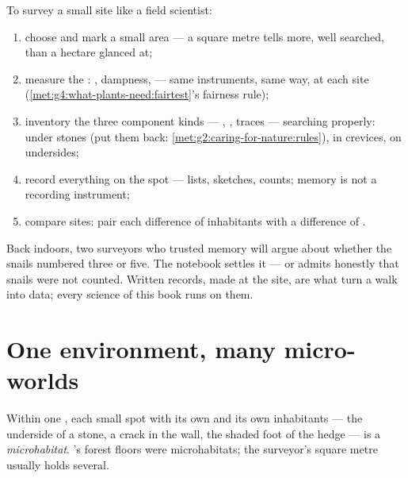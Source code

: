 \begin{method}\label{met:g6:exploring-our-environment:survey}
To survey a small site like a field scientist:
\begin{enumerate}
  \item choose and mark a small area --- a square metre tells
        more, well searched, than a hectare glanced at;
  \item measure the : , dampness, 
        --- same instruments, same way, at each site
        (\cref{met:g4:what-plants-need:fairtest}'s fairness
        rule);
  \item inventory the three component kinds --- ,
        , traces --- searching properly: under
        stones (put them back:
        \cref{met:g2:caring-for-nature:rules}), in crevices,
        on  undersides;
  \item record everything on the spot --- lists, sketches,
        counts; memory is not a recording instrument;
  \item compare sites: pair each difference of inhabitants
        with a difference of .
\end{enumerate}
\end{method}

\begin{remark}\label{rem:g6:exploring-our-environment:records}
Back indoors, two surveyors who trusted memory will argue
about whether the snails numbered three or five. The notebook
settles it --- or admits honestly that snails were not
counted. Written records, made at the site, are what turn a
walk into data; every science of this book runs on them.
\end{remark}

\section{One environment, many micro-worlds}

\begin{definition}[Microhabitat]\label{def:g6:exploring-our-environment:microhabitat}
Within one , each small spot with its own
 and its own inhabitants --- the underside of a
stone, a crack in the wall, the shaded foot of the hedge ---
is a \emph{microhabitat}.
's forest floors were
microhabitats; the surveyor's square metre usually holds
several.
\end{definition}

